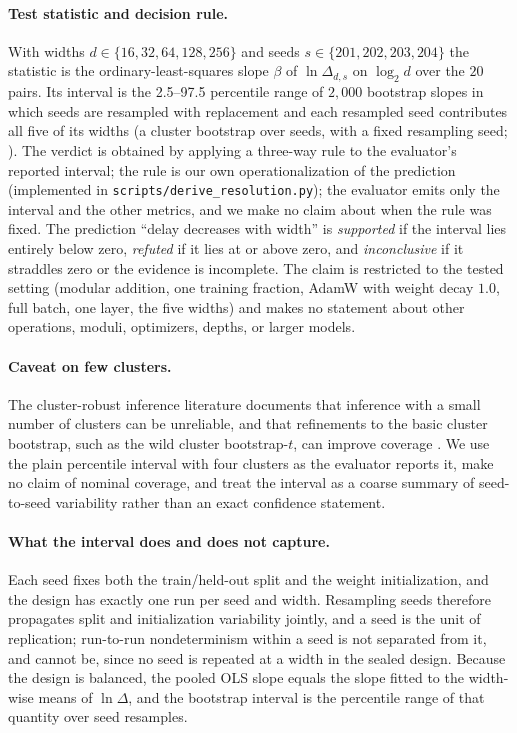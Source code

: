 \documentclass{article}
\begin{document}
\paragraph{Test statistic and decision rule.} With widths $d\in\{16,32,64,128,256\}$ and seeds $s\in\{201,202,203,204\}$ the statistic is the ordinary-least-squares slope $\beta$ of $\ln\Delta_{d,s}$ on $\log_2 d$ over the $20$ pairs. Its interval is the 2.5--97.5 percentile range of $2{,}000$ bootstrap slopes in which seeds are resampled with replacement and each resampled seed contributes all five of its widths (a cluster bootstrap over seeds, with a fixed resampling seed; \citealp{Cameron2015APG}). The verdict is obtained by applying a three-way rule to the evaluator's reported interval; the rule is our own operationalization of the prediction (implemented in \texttt{scripts/derive\_resolution.py}); the evaluator emits only the interval and the other metrics, and we make no claim about when the rule was fixed. The prediction ``delay decreases with width'' is \emph{supported} if the interval lies entirely below zero, \emph{refuted} if it lies at or above zero, and \emph{inconclusive} if it straddles zero or the evidence is incomplete. The claim is restricted to the tested setting (modular addition, one training fraction, AdamW with weight decay $1.0$, full batch, one layer, the five widths) and makes no statement about other operations, moduli, optimizers, depths, or larger models.

\paragraph{Caveat on few clusters.} The cluster-robust inference literature documents that inference with a small number of clusters can be unreliable, and that refinements to the basic cluster bootstrap, such as the wild cluster bootstrap-$t$, can improve coverage \citep{Cameron2008BootstrapBasedIF,Cameron2015APG}. We use the plain percentile interval with four clusters as the evaluator reports it, make no claim of nominal coverage, and treat the interval as a coarse summary of seed-to-seed variability rather than an exact confidence statement.

\paragraph{What the interval does and does not capture.} Each seed fixes both the train/held-out split and the weight initialization, and the design has exactly one run per seed and width. Resampling seeds therefore propagates split and initialization variability jointly, and a seed is the unit of replication; run-to-run nondeterminism within a seed is not separated from it, and cannot be, since no seed is repeated at a width in the sealed design. Because the design is balanced, the pooled OLS slope equals the slope fitted to the width-wise means of $\ln\Delta$, and the bootstrap interval is the percentile range of that quantity over seed resamples.
\end{document}
